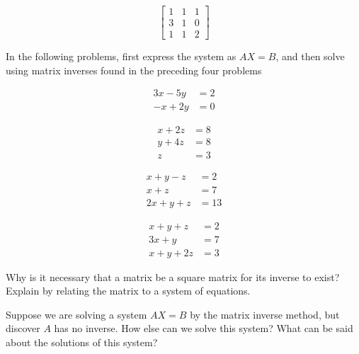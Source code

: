 \begin{puzzle}
    \[
        \begin{bmatrix}
            1 & 1 & 1 \\
            3 & 1 & 0 \\
            1 & 1 & 2
        \end{bmatrix}
    \]
\end{puzzle}

In the following problems, first express the system as $AX = B$, and then solve using matrix inverses found
in the preceding four problems

\begin{puzzle}
    \begin{align*}
        3x - 5y & = 2 \\
        -x + 2y & = 0
    \end{align*}
\end{puzzle}

\begin{puzzle}
    \begin{align*}
        x + 2z & = 8 \\
        y + 4z & = 8 \\
        z      & = 3
    \end{align*}
\end{puzzle}

\begin{puzzle}
    \begin{align*}
        x + y - z  & = 2  \\
        x + z      & = 7  \\
        2x + y + z & = 13
    \end{align*}
\end{puzzle}

\begin{puzzle}
    \begin{align*}
        x + y + z  & = 2 \\
        3x + y     & = 7 \\
        x + y + 2z & = 3
    \end{align*}
\end{puzzle}

\begin{puzzle}
    Why is it necessary that a matrix be a square matrix for its inverse to exist? Explain by relating the matrix to a system of equations.
    \end{puzzle}
    
    \begin{puzzle}
    Suppose we are solving a system \(AX = B\) by the matrix inverse method, but discover \(A\) has no inverse. How else can we solve this system? What can be said about the solutions of this system?
    \end{puzzle}
    